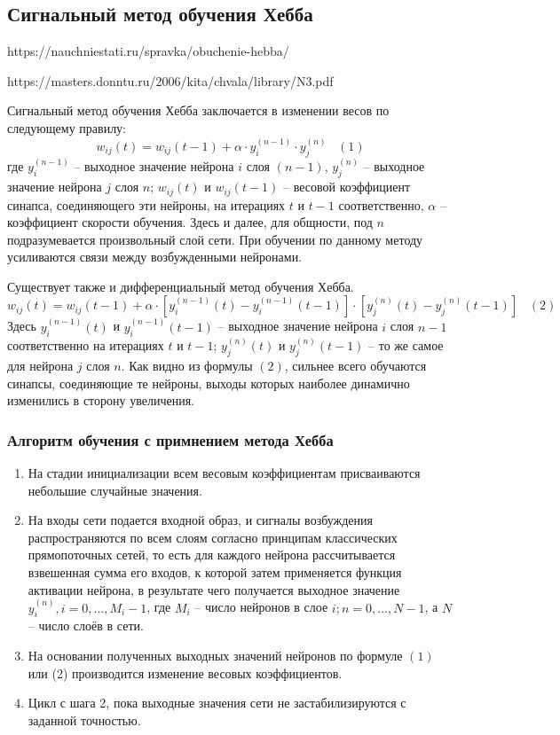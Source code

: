 \documentclass[bachelor, och, referat]{SCWorks}
\begin{document}
\subsection{Сигнальный метод обучения Хебба}
https://nauchniestati.ru/spravka/obuchenie-hebba/

https://masters.donntu.ru/2006/kita/chvala/library/N3.pdf

Сигнальный метод обучения Хебба заключается в изменении весов по следующему
правилу:
\[ w_{ij}(t) = w_{ij}(t - 1) + \alpha \cdot y_i^{(n - 1)} \cdot y_j^{(n)} \; \; \; (1)\]
где $y_i^{(n - 1)}$ -- выходное значение нейрона $i$ слоя 
$(n - 1)$, $y_j^{(n)}$ -- выходное значение нейрона $j$ слоя $n$;
$w_{ij}(t)$ и $w_{ij}(t - 1)$ -- весовой коэффициент синапса, 
соединяющего эти нейроны, на итерациях $t$ и $t - 1$ соответственно,
$\alpha$ -- коэффициент скорости обучения. Здесь и далее, для
общности, под $n$ подразумевается произвольный слой сети. 
При обучении по данному методу усиливаются связи между возбужденными нейронами. 

Существует также и дифференциальный метод обучения Хебба.
\[ w_{ij}(t) = w_{ij}(t - 1) + \alpha \cdot [y_i^{(n-1)}(t) - 
y_i^{(n - 1)}(t - 1)] \cdot [y_j^{(n)}(t) - y_j^{(n)}(t - 1)] \; \; \; (2)\]
Здесь $y_i^{(n-1)}(t)$ и $y_i^{(n - 1)}(t - 1)$ -- выходное
значение нейрона $i$ слоя $n - 1$ соответственно на итерациях
$t$ и $t - 1$; $y_j^{(n)}(t)$ и $y_j^{(n)}(t - 1)$ -- то же самое
для нейрона $j$ слоя $n$. Как видно из формулы $(2)$,
сильнее всего обучаются синапсы, соединяющие те нейроны,
выходы которых наиболее динамично изменились в сторону увеличения.

\subsubsection{Алгоритм обучения с примнением метода Хебба}
\begin{enumerate}
    \item На стадии инициализации всем весовым коэффициентам присваиваются небольшие
    случайные значения.
    \item На входы сети подается входной образ, и сигналы возбуждения распространяются по
    всем слоям согласно принципам классических прямопоточных сетей, 
    то есть для каждого нейрона рассчитывается взвешенная сумма его входов, 
    к которой затем применяется функция активации нейрона, в результате
    чего получается выходное значение $y_i^{(n)}, i = 0, \dots, M_i - 1$,
    где $M_i$ -- число нейронов в слое $i; n = 0, \dots, N - 1$, а $N$
    -- число слоёв в сети.
    \item На основании полученных выходных значений нейронов по формуле $(1)$ или (2)
    производится изменение весовых коэффициентов. 
    \item Цикл с шага 2, пока выходные значения сети не застабилизируются с заданной точностью.
\end{enumerate}
\end{document}
